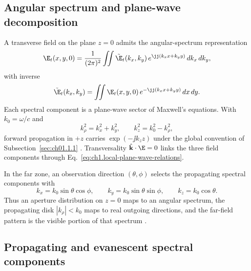 \subsection{Angular spectrum and plane-wave decomposition}
\label{sec:ch01.2.5}

A transverse field on the plane $z=0$ admits the angular-spectrum representation \cite{stratton1941,silver1949,bornwolf1999}
\begin{equation}
\label{eq:ch1.angular-spectrum}
\E_t(x,y,0)
=
\frac{1}{(2\pi)^2}\iint \tilde{\E}_t(k_x,k_y)\,
e^{\jj(k_x x+k_y y)}\,dk_x\,dk_y,
\end{equation}
with inverse
\begin{equation}
\label{eq:ch1.angular-spectrum-inverse}
\tilde{\E}_t(k_x,k_y)
=
\iint \E_t(x,y,0)\,
e^{-\jj(k_x x+k_y y)}\,dx\,dy.
\end{equation}
Each spectral component is a plane-wave sector of Maxwell's equations. With $k_0=\omega/c$ and
\begin{equation}
\label{eq:ch1.k-perp-kz}
k_\rho^2=k_x^2+k_y^2,\qquad
k_z^2=k_0^2-k_\rho^2,
\end{equation}
forward propagation in $+z$ carries $\exp(-\jj k_z z)$ under the global convention of Subsection~\ref{sec:ch01.1.1} \cite{stratton1941,felsen1994}. Transversality $\hat{\mathbf{k}}\cdot\E=0$ links the three field components through Eq.~\eqref{eq:ch1.local-plane-wave-relations}.

In the far zone, an observation direction $(\theta,\phi)$ selects the propagating spectral components with \cite{stratton1941,silver1949}
\begin{equation}
\label{eq:ch1.far-field-k-relation}
k_x=k_0\sin\theta\cos\phi,\qquad
k_y=k_0\sin\theta\sin\phi,\qquad
k_z=k_0\cos\theta.
\end{equation}
Thus an aperture distribution on $z=0$ maps to an angular spectrum, the propagating disk $|k_\rho|<k_0$ maps to real outgoing directions, and the far-field pattern is the visible portion of that spectrum \cite{stratton1941,bornwolf1999}.


\subsection{Propagating and evanescent spectral components}
\label{sec:ch01.2.6}

